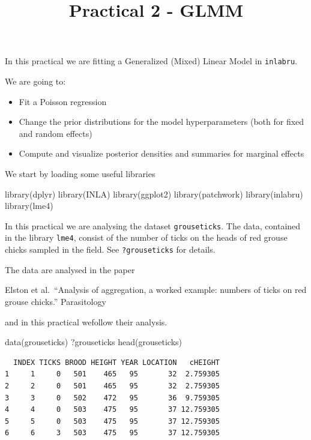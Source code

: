 \documentclass[
  letterpaper,
  DIV=11,
  numbers=noendperiod]{scrartcl}
\title{Practical 2 - GLMM}
\author{}
\date{}
\makeatletter
\newenvironment{Shaded}{\begin{snugshade}}{\end{snugshade}}
\newcommand{\FunctionTok}[1]{\textcolor[rgb]{0.28,0.35,0.67}{#1}}
\newcommand{\NormalTok}[1]{\textcolor[rgb]{0.00,0.23,0.31}{#1}}
\providecommand{\tightlist}{%
  \setlength{\itemsep}{0pt}\setlength{\parskip}{0pt}}
\renewcommand{\maketitle}{\bgroup\setlength{\parindent}{0pt}
\begin{flushleft}
  {\sffamily\huge\textbf{\MakeUppercase{\@title}}} \vspace{0.3cm} \newline
  {\Large {\@subtitle}} \newline
  \@author
\end{flushleft}\egroup
}
\makeatother
\begin{document}
\maketitle

\pagestyle{mystyle}


In this practical we are fitting a Generalized (Mixed) Linear Model in
\texttt{inlabru}.

We are going to:

\begin{itemize}
\tightlist
\item
  Fit a Poisson regression
\item
  Change the prior distributions for the model hyperparameters (both for
  fixed and random effects)
\item
  Compute and visualize posterior densities and summaries for marginal
  effects
\end{itemize}

We start by loading some useful libraries

\begin{Shaded}
\begin{Highlighting}[]
\FunctionTok{library}\NormalTok{(dplyr)}
\FunctionTok{library}\NormalTok{(INLA)}
\FunctionTok{library}\NormalTok{(ggplot2)}
\FunctionTok{library}\NormalTok{(patchwork)}
\FunctionTok{library}\NormalTok{(inlabru)     }
\FunctionTok{library}\NormalTok{(lme4)}
\end{Highlighting}
\end{Shaded}

In this practical we are analysing the dataset \texttt{grouseticks}. The
data, contained in the library \texttt{lme4}, consist of the number of
ticks on the heads of red grouse chicks sampled in the field. See
\texttt{?grouseticks} for details.

The data are analysed in the paper

Elston et al.~``Analysis of aggregation, a worked example: numbers of
ticks on red grouse chicks.'' Parasitology

and in this practical wefollow their analysis.

\begin{Shaded}
\begin{Highlighting}[]
\FunctionTok{data}\NormalTok{(grouseticks)}
\NormalTok{?grouseticks}
\FunctionTok{head}\NormalTok{(grouseticks)}
\end{Highlighting}
\end{Shaded}

\begin{verbatim}
  INDEX TICKS BROOD HEIGHT YEAR LOCATION   cHEIGHT
1     1     0   501    465   95       32  2.759305
2     2     0   501    465   95       32  2.759305
3     3     0   502    472   95       36  9.759305
4     4     0   503    475   95       37 12.759305
5     5     0   503    475   95       37 12.759305
6     6     3   503    475   95       37 12.759305
\end{verbatim}
\end{document}
